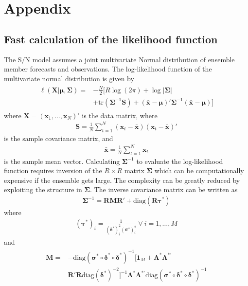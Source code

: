 \documentclass[12pt]{article}
\renewcommand{\vec}[1]{\bm{#1}}
\newcommand{\mat}[1]{\bm{#1}}
\newcommand{\diag}{\text{diag}}
\newcommand{\tr}{\text{tr}}
\begin{document}
\section{Appendix}
\subsection{Fast calculation of the likelihood function}

The S/N model assumes a joint multivariate Normal distribution of ensemble member forecasts and observations.
The log-likelihood function of the multivariate normal distribution is given by 
%
\begin{align}
\begin{aligned}
\ell(\mat{X} | \vec{\mu}, \mat{\Sigma}) = & -\frac{N}{2}\bigg[R \log(2\pi) + \log|\mat{\Sigma}| \\
& + \tr(\mat{\Sigma}^{-1} \mat{S}) + (\bar{\vec{x}} - \vec{\mu})'\mat{\Sigma}^{-1}(\bar{\vec{x}}-\vec{\mu})\bigg]
\end{aligned}
\end{align}
%
 where $\mat{X} = (\vec{x}_1, \dots, \vec{x}_N)'$ is the data matrix, where
%
\begin{align}
\mat{S} = \frac{1}{N} \sum_{t=1}^N (\vec{x}_t - \bar{\vec{x}})(\vec{x}_t - \bar{\vec{x}})'
\end{align}
is the sample covariance matrix, and
\begin{align}
\bar{\vec{x}} = \frac{1}{N} \sum_{t=1}^N \vec{x}_t
\end{align}
is the sample mean vector.
Calculating $\mat{\Sigma}^{-1}$ to evaluate the log-likelihood function requires inversion of the $R \times R$ matrix $\mat{\Sigma}$ which can be computationally expensive if the ensemble gets large.
The complexity can be greatly reduced by exploiting the structure in $\mat{\Sigma}$.
The inverse covariance matrix can be written as
%
\begin{align}
\mat{\Sigma}^{-1} = \mat{R} \mat{M} \mat{R}' + \diag(\mat{R}\vec{\tau}^*)
\label{eq:repr_sigma_inv}
\end{align}
%
where
%
\begin{align}
(\vec{\tau}^*)_i = \frac{1}{(\vec{\delta}^*)_i^2 (\vec{\sigma}^*)_i^2}\ \forall\ i=1,\dots,M
\end{align}
%
and
%
\begin{align}
\begin{aligned}
\mat{M} = & - \diag(\vec{\sigma}^* \circ \vec{\delta}^* \circ \vec{\delta}^*)^{-1} \big[ \mat{1}_M + \mat{\Lambda}^*\mat{\Lambda}^{*'}\\ 
& \mat{R}'\mat{R}\diag(\vec{\delta}^*)^{-2} \big]^{-1} \mat{\Lambda}^* \mat{\Lambda}^{*'} \diag(\vec{\sigma}^* \circ \vec{\delta}^* \circ \vec{\delta}^*)^{-1} 
\end{aligned}
\end{align}
\end{document}
